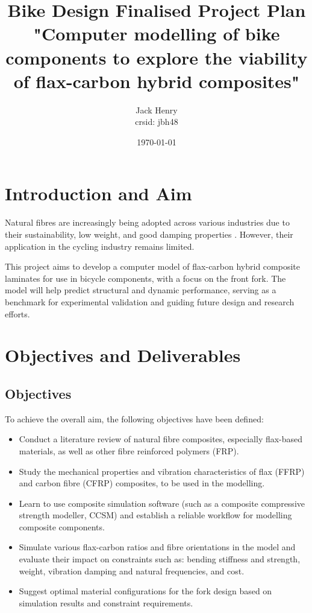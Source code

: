 \documentclass[9pt,twocolumn,twoside]{article}
\title{Bike Design Finalised Project Plan \\
"Computer modelling of bike components to explore the viability of flax-carbon hybrid composites"
}
\author{Jack Henry
\\ crsid: jbh48}
\date{\today}
\begin{document}


\maketitle

\setcounter{page}{1}

\section{Introduction and Aim}

Natural fibres are increasingly being adopted across various industries due to their sustainability, low weight, and good damping properties \cite{Bcomp}. However, their application in the cycling industry remains limited. 

This project aims to develop a computer model of flax-carbon hybrid composite laminates for use in bicycle components, with a focus on the front fork. The model will help predict structural and dynamic performance, serving as a benchmark for experimental validation and guiding future design and research efforts.

\section{Objectives and Deliverables}

\subsection*{Objectives}
To achieve the overall aim, the following objectives have been defined:

\begin{itemize}
  \item Conduct a literature review of natural fibre composites, especially flax-based materials, as well as other fibre reinforced polymers (FRP).
  \item Study the mechanical properties and vibration characteristics of flax (FFRP) and carbon fibre (CFRP) composites, to be used in the modelling.
  \item Learn to use composite simulation software (such as a composite compressive strength modeller, CCSM) and establish a reliable workflow for modelling composite components.
  \item Simulate various flax-carbon ratios and fibre orientations in the model and evaluate their impact on constraints such as: bending stiffness and strength, weight, vibration damping and natural frequencies, and cost.
  \item Suggest optimal material configurations for the fork design based on simulation results and constraint requirements.
\end{itemize}
\end{document}
